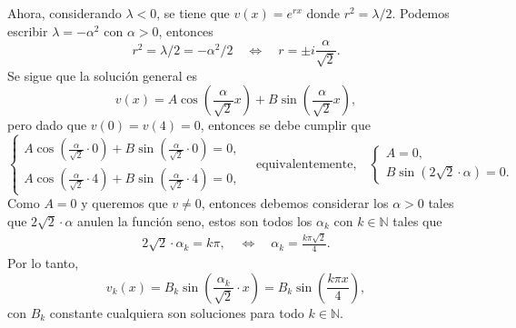\documentclass[12pt]{article}
\newcommand{\N}{\mathbb{N}}
\newcommand{\pp}[1]{\left( #1 \right)}
\newcommand{\Text}[1]{\quad\text{#1}\quad}
\newcommand{\Ssi}{\quad\Longleftrightarrow\quad}
\renewcommand{\l}{\lambda}
\renewcommand{\a}{\alpha}
\begin{document}
\begin{enumerate}
\begin{enumerate}
            Ahora, considerando $\l<0$, se tiene que $v(x)=e^{rx}$ donde $r^2=\l/2$. Podemos escribir $\l=-\a^2$ con $\a>0$, entonces 
            \[r^2=\l/2=-\a^2/2\Ssi r=\pm i\frac{\a}{\sqrt{2}}.\]
            Se sigue que la solución general es
            \[v(x) = A\cos\pp{\frac{\a}{\sqrt{2}} x} + B\sin\pp{\frac{\a}{\sqrt{2}} x},\]
            pero dado que $v(0)=v(4)=0$, entonces se debe cumplir que
            \[
            \begin{cases}
                A\cos\pp{\frac{\a}{\sqrt{2}}\cdot 0} + B\sin\pp{\frac{\a}{\sqrt{2}}\cdot 0} = 0,\\
                A\cos\pp{\frac{\a}{\sqrt{2}}\cdot 4} + B\sin\pp{\frac{\a}{\sqrt{2}}\cdot 4} =0,
            \end{cases}
            \Text{equivalentemente,}
            \begin{cases}
                A = 0,\\
                B\sin\pp{2\sqrt{2}\cdot\a} =0.
            \end{cases}
            \]
            Como $A=0$ y queremos que $v\neq 0$, entonces debemos considerar los $\a>0$ tales que $2\sqrt{2}\cdot \a$ anulen la función seno, estos son todos los $\a_k$ con $k\in\N$ tales que
            \begin{align*}
                2\sqrt{2}\cdot \a_k = k\pi,\Ssi \a_k=\frac{k\pi\sqrt{2}}{4}.
            \end{align*}
            Por lo tanto,
            \[ v_k(x) = B_k\sin\pp{\frac{\a_k}{\sqrt{2}}\cdot x}= B_k\sin\pp{\frac{k\pi x}{4}}, \]
            con $B_k$ constante cualquiera son soluciones para todo $k\in\N$.


\end{enumerate}
\end{enumerate}
\end{document}
